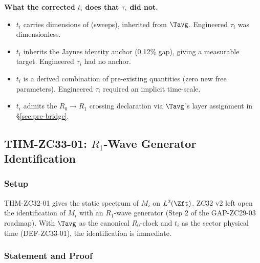 \documentclass[12pt, a4paper]{article}
\begin{document}
\textbf{What the corrected $t_i$ does that $\tau_i$ did not.}
\begin{itemize}[leftmargin=*, noitemsep]
\item $t_i$ carries dimensions of (sweeps), inherited from
  $\Tavg$. Engineered $\tau_i$ was dimensionless.
\item $t_i$ inherits the Jaynes identity anchor (0.12\% gap),
  giving a measurable target. Engineered $\tau_i$ had no
  anchor.
\item $t_i$ is a derived combination of pre-existing
  quantities (zero new free parameters). Engineered $\tau_i$
  required an implicit time-scale.
\item $t_i$ admits the $R_0\to R_1$ crossing declaration via
  $\Tavg$'s layer assignment in §\ref{sec:pre-bridge}.
\end{itemize}

\subsection{THM-ZC33-01: $R_1$-Wave Generator Identification}
\label{sec:thm-zc33-01}

\subsubsection{Setup}

THM-ZC32-01 gives the static spectrum of $M_i$ on $L^2(\Zft)$.
ZC32 v2 left open the identification of $M_i$ with an
$R_1$-wave generator (Step 2 of the GAP-ZC29-03 roadmap).
With $\Tavg$ as the canonical $R_0$-clock and $t_i$ as the
sector physical time (DEF-ZC33-01), the identification is
immediate.

\subsubsection{Statement and Proof}
\end{document}
